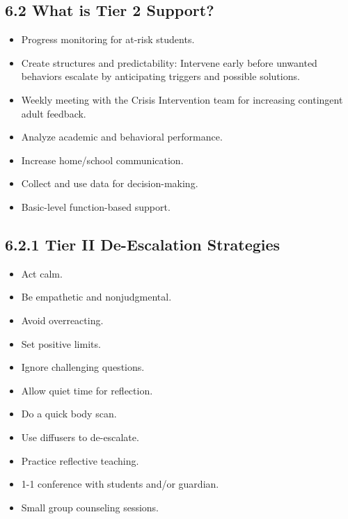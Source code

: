 \documentclass[11pt]{article}
\begin{document}
\subsection{6.2 What is Tier 2 Support?}
\label{sec:org1f6a778}

\begin{itemize}
\item Progress monitoring for at-risk students.

\item Create structures and predictability: Intervene early before unwanted behaviors escalate by anticipating triggers and possible solutions.

\item Weekly meeting with the Crisis Intervention team for increasing contingent adult feedback.

\item Analyze academic and behavioral performance.

\item Increase home/school communication.

\item Collect and use data for decision-making.

\item Basic-level function-based support.
\end{itemize}

\subsection{6.2.1 Tier II De-Escalation Strategies}
\label{sec:org8939cc0}

\begin{itemize}
\item Act calm.

\item Be empathetic and nonjudgmental.

\item Avoid overreacting.

\item Set positive limits.

\item Ignore challenging questions.

\item Allow quiet time for reflection.

\item Do a quick body scan.

\item Use diffusers to de-escalate.

\item Practice reflective teaching.

\item 1-1 conference with students and/or guardian.

\item Small group counseling sessions.
\end{itemize}
\end{document}
